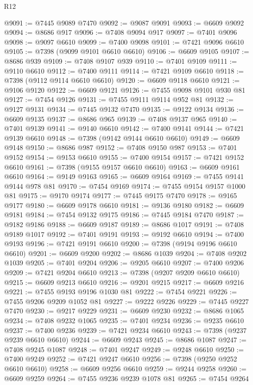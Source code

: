 \begin{lexlean}{R12}
\begin{coremodule}
@9091 := @7445 @9089 @7470
@9092 := @9087 @9091
@9093 := @6609 @9092
@9094 := @8686 @917
@9096 := @7408 @9094 @917
@9097 := @7401 @9096
@9098 := @9097 @6610
@9099 := @7400 @9098
@9101 := @7421 @9096 @6610
@9105 := @7398 (@9099 @9101 @6610 @6610)
@9106 := @6609 @9105
@9107 := @8686 @939
@9109 := @7408 @9107 @939
@9110 := @7401 @9109
@9111 := @9110 @6610
@9112 := @7400 @9111
@9114 := @7421 @9109 @6610
@9118 := @7398 (@9112 @9114 @6610 @6610)
@9120 := @6609 @9118 @6610
@9121 := @9106 @9120
@9122 := @6609 @9121
@9126 := @7455 @9098 @9101 @930 @81
@9127 := @7454 @9126
@9131 := @7455 @9111 @9114 @952 @81
@9132 := @9127 @9131
@9134 := @7445 @9132 @7470
@9135 := @9122 @9134
@9136 := @6609 @9135
@9137 := @8686 @965
@9139 := @7408 @9137 @965
@9140 := @7401 @9139
@9141 := @9140 @6610
@9142 := @7400 @9141
@9144 := @7421 @9139 @6610
@9148 := @7398 (@9142 @9144 @6610 @6610)
@9149 := @6609 @9148
@9150 := @8686 @987
@9152 := @7408 @9150 @987
@9153 := @7401 @9152
@9154 := @9153 @6610
@9155 := @7400 @9154
@9157 := @7421 @9152 @6610
@9161 := @7398 (@9155 @9157 @6610 @6610)
@9163 := @6609 @9161 @6610
@9164 := @9149 @9163
@9165 := @6609 @9164
@9169 := @7455 @9141 @9144 @978 @81
@9170 := @7454 @9169
@9174 := @7455 @9154 @9157 @1000 @81
@9175 := @9170 @9174
@9177 := @7445 @9175 @7470
@9178 := @9165 @9177
@9180 := @6609 @9178 @6610
@9181 := @9136 @9180
@9182 := @6609 @9181
@9184 := @7454 @9132 @9175
@9186 := @7445 @9184 @7470
@9187 := @9182 @9186
@9188 := @6609 @9187
@9189 := @8686 @1017
@9191 := @7408 @9189 @1017
@9192 := @7401 @9191
@9193 := @9192 @6610
@9194 := @7400 @9193
@9196 := @7421 @9191 @6610
@9200 := @7398 (@9194 @9196 @6610 @6610)
@9201 := @6609 @9200
@9202 := @8686 @1039
@9204 := @7408 @9202 @1039
@9205 := @7401 @9204
@9206 := @9205 @6610
@9207 := @7400 @9206
@9209 := @7421 @9204 @6610
@9213 := @7398 (@9207 @9209 @6610 @6610)
@9215 := @6609 @9213 @6610
@9216 := @9201 @9215
@9217 := @6609 @9216
@9221 := @7455 @9193 @9196 @1030 @81
@9222 := @7454 @9221
@9226 := @7455 @9206 @9209 @1052 @81
@9227 := @9222 @9226
@9229 := @7445 @9227 @7470
@9230 := @9217 @9229
@9231 := @6609 @9230
@9232 := @8686 @1065
@9234 := @7408 @9232 @1065
@9235 := @7401 @9234
@9236 := @9235 @6610
@9237 := @7400 @9236
@9239 := @7421 @9234 @6610
@9243 := @7398 (@9237 @9239 @6610 @6610)
@9244 := @6609 @9243
@9245 := @8686 @1087
@9247 := @7408 @9245 @1087
@9248 := @7401 @9247
@9249 := @9248 @6610
@9250 := @7400 @9249
@9252 := @7421 @9247 @6610
@9256 := @7398 (@9250 @9252 @6610 @6610)
@9258 := @6609 @9256 @6610
@9259 := @9244 @9258
@9260 := @6609 @9259
@9264 := @7455 @9236 @9239 @1078 @81
@9265 := @7454 @9264

\end{coremodule}
\end{lexlean}
